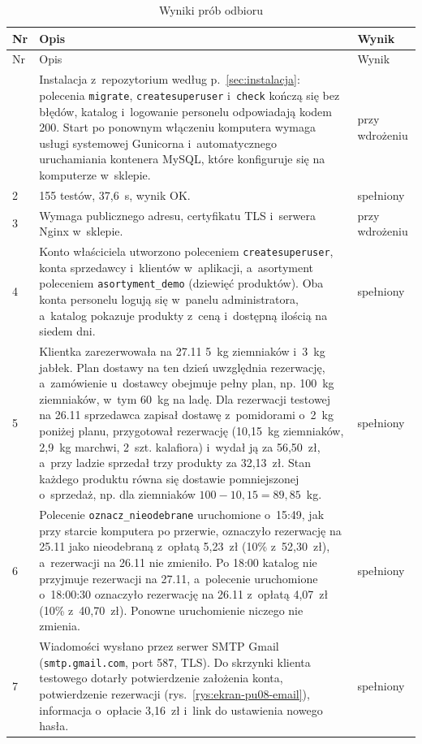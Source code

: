 \documentclass[12pt,a4paper,oneside]{article}
\newcounter{pu}
\begin{document}
{\small
\begin{longtable}{@{}L{0.6cm}L{11.2cm}L{2.4cm}@{}}
	\caption{Wyniki prób odbioru}
	\label{tab:checklista-wyniki}\\
	\toprule
	Nr & Opis & Wynik \\
	\midrule
	\endfirsthead
	\toprule
	Nr & Opis & Wynik \\
	\midrule
	\endhead
	\bottomrule
	 & Instalacja z~repozytorium według p.~\ref{sec:instalacja}: polecenia \texttt{migrate}, \texttt{createsuperuser} i~\texttt{check} kończą się bez błędów, katalog i~logowanie personelu odpowiadają kodem 200. Start po ponownym włączeniu komputera wymaga usługi systemowej Gunicorna i~automatycznego uruchamiania kontenera MySQL, które konfiguruje się na komputerze w~sklepie. & przy wdrożeniu \\
	2 & 155 testów, 37,6~s, wynik OK. & spełniony \\
	3 & Wymaga publicznego adresu, certyfikatu TLS i~serwera Nginx w~sklepie. & przy wdrożeniu \\
	4 & Konto właściciela utworzono poleceniem \texttt{createsuperuser}, konta sprzedawcy i~klientów w~aplikacji, a~asortyment poleceniem \texttt{asortyment\_demo} (dziewięć produktów). Oba konta personelu logują się w~panelu administratora, a~katalog pokazuje produkty z~ceną i~dostępną ilością na siedem dni. & spełniony \\
	5 & Klientka zarezerwowała na 27.11 5~kg ziemniaków i~3~kg jabłek. Plan dostawy na ten dzień uwzględnia rezerwację, a~zamówienie u~dostawcy obejmuje pełny plan, np. 100~kg ziemniaków, w~tym 60~kg na ladę. Dla rezerwacji testowej na 26.11 sprzedawca zapisał dostawę z~pomidorami o~2~kg poniżej planu, przygotował rezerwację (10,15~kg ziemniaków, 2,9~kg marchwi, 2~szt. kalafiora) i~wydał ją za 56,50~zł, a~przy ladzie sprzedał trzy produkty za 32,13~zł. Stan każdego produktu równa się dostawie pomniejszonej o~sprzedaż, np. dla ziemniaków $100 - 10{,}15 = 89{,}85$~kg. & spełniony \\
	6 & Polecenie \texttt{oznacz\_nieodebrane} uruchomione o~15:49, jak przy starcie komputera po przerwie, oznaczyło rezerwację na 25.11 jako nieodebraną z~opłatą 5,23~zł (10\% z~52,30~zł), a~rezerwacji na 26.11 nie zmieniło. Po 18:00 katalog nie przyjmuje rezerwacji na 27.11, a~polecenie uruchomione o~18:00:30 oznaczyło rezerwację na 26.11 z~opłatą 4,07~zł (10\% z~40,70~zł). Ponowne uruchomienie niczego nie zmienia. & spełniony \\
	7 & Wiadomości wysłano przez serwer SMTP Gmail (\texttt{smtp.gmail.com}, port 587, TLS). Do skrzynki klienta testowego dotarły potwierdzenie założenia konta, potwierdzenie rezerwacji (rys.~\ref{rys:ekran-pu08-email}), informacja o~opłacie 3,16~zł i~link do ustawienia nowego hasła. & spełniony \\

\end{longtable}}
\end{document}
